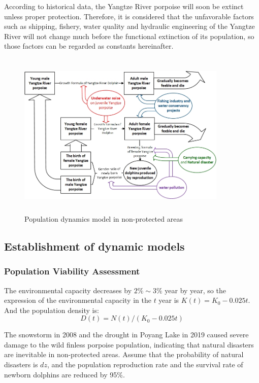 \documentclass[12pt]{article}  %
\begin{document}
According to historical data, the Yangtze River porpoise will soon be extinct unless proper protection. Therefore, it is considered that the unfavorable factors such as shipping, fishery, water quality and hydraulic engineering of the Yangtze River will not change much before the functional extinction of its population, so those factors can be regarded as constants hereinafter.
\begin{figure}[htbp]%
	\small
	\centering
	\includegraphics[height=8cm,width=10cm]{figures/2mod.jpg}%
	\caption{Population dynamics model in non-protected areas}%
\end{figure}

\subsection{Establishment of dynamic models}
\subsubsection{Population Viability Assessment}
The environmental capacity decreases by $2\%\sim 3\%$ year by year, so the expression of the environmental capacity in the $t$ year is $K(t)={{K}_{0}}-0.025t$. And the population density is:
\begin{equation}
D(t)=N(t)/({{K}_{0}}-0.025t)    
\end{equation}

The snowstorm in 2008 and the drought in Poyang Lake in 2019 caused severe damage to the wild finless porpoise population, indicating that natural disasters are inevitable in non-protected areas. Assume that the probability of natural disasters is $dz$, and the population reproduction rate and the survival rate of newborn dolphins are reduced by 95\%.
\end{document}
